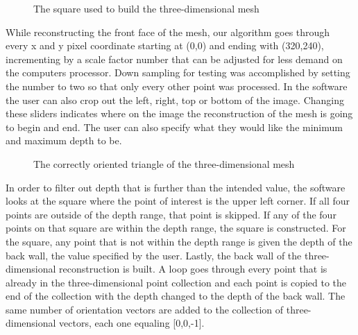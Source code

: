 \documentclass[pdftex,10.5pt]{report}
\begin{document}
\begin{figure}[H]
\centering
	\caption{The square used to build the three-dimensional mesh}
		\label{square}
\end{figure}

While reconstructing the front face of the mesh, our algorithm goes through every x and y pixel coordinate starting at (0,0) and ending with (320,240), incrementing by a scale factor number that can be adjusted for less demand on the computers processor. Down sampling for testing was accomplished by setting the number to two so that only every other point was processed. In the software the user can also crop out the left, right, top or bottom of the image. Changing these sliders indicates where on the image the reconstruction of the mesh is going to begin and end. The user can also specify what they would like the minimum and maximum depth to be. 

\begin{figure}[H]
\centering
	\caption{The correctly oriented triangle of the three-dimensional mesh}
	\label{triangle}
\end{figure}

In order to filter out depth that is further than the intended value, the software looks at the square where the point of interest is the upper left corner.  If all four points are outside of the depth range, that point is skipped. If any of the four points on that square are within the depth range, the square is constructed. For the square, any point that is not within the depth range is given the depth of the back wall, the value specified by the user. Lastly, the back wall of the three-dimensional reconstruction is built. A loop goes through every point that is already in the three-dimensional point collection and each point is copied to the end of the collection with the depth changed to the depth of the back wall. The same number of orientation vectors are added to the collection of three-dimensional vectors, each one equaling [0,0,-1]. 
\cite{cite8}
\end{document}
